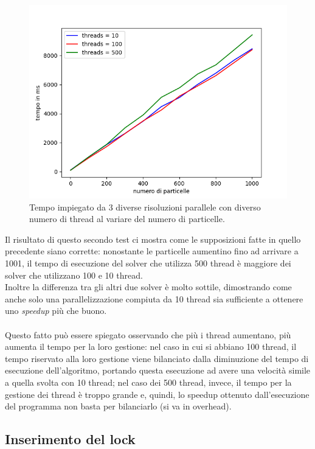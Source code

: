 \documentclass[10pt,twocolumn,letterpaper]{article}
\begin{document}
\begin{figure}[H]
\includegraphics[width=1.1\linewidth]{test/threadsTestV2/result.png} 
\caption{\small Tempo impiegato da 3 diverse risoluzioni parallele con diverso numero di thread al variare del numero di particelle.}
\label{t3_2}
\end{figure}

Il risultato di questo secondo test ci mostra come le supposizioni fatte in quello precedente siano corrette: nonostante le particelle aumentino fino ad arrivare a 1001, il tempo di esecuzione del solver che utilizza 500 thread è maggiore dei solver che utilizzano 100 e 10 thread.\\
Inoltre la differenza tra gli altri due solver è molto sottile, dimostrando come anche solo una parallelizzazione compiuta da 10 thread sia sufficiente a ottenere uno \textit{speedup} più che buono.\\
\\
Questo fatto può essere spiegato osservando che più i thread aumentano, più aumenta il tempo per la loro gestione: nel caso in cui si abbiano 100 thread, il tempo riservato alla loro gestione viene bilanciato dalla diminuzione del tempo di esecuzione dell'algoritmo, portando questa esecuzione ad avere una velocità simile a quella svolta con 10 thread; nel caso dei 500 thread, invece, il tempo per la gestione dei thread è troppo grande e, quindi, lo speedup ottenuto dall'esecuzione del programma non basta per bilanciarlo (si va in overhead).

\subsection{Inserimento del lock}
\end{document}
